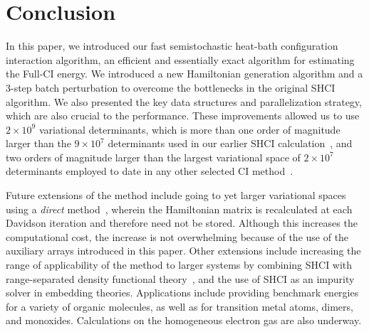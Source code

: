 \documentclass[%
reprint,
 superscriptaddress,
 amsmath,amssymb,
 aps,
]{revtex4-1}
\begin{document}
\section{Conclusion}
\label{conclusion}
In this paper, we introduced our fast semistochastic heat-bath configuration interaction algorithm, an efficient and essentially exact algorithm for estimating the Full-CI energy.
We introduced a new Hamiltonian generation algorithm and a 3-step batch perturbation to overcome the bottlenecks in the original SHCI algorithm.
We also presented the key data structures and parallelization strategy, which are also crucial to the performance.
These improvements allowed us to use $2 \times 10^9$ variational determinants, which is more than one order of magnitude larger than the $9\times 10^7$ determinants
used in our earlier SHCI calculation~\cite{ChiHolOttUmrShaZim-JPCA-18}, and two orders of magnitude larger than the largest variational space of $2\times 10^7$ determinants
employed to date in any other selected CI method~\cite{GarSceLooCaf-JCP-17}.

Future extensions of the method include going to yet larger variational spaces using a \emph{direct} method~\cite{Knowles1984,IvaRue-TCA-01}, wherein the Hamiltonian matrix is recalculated at each Davidson iteration and therefore need not be stored.
Although this increases the computational cost, the increase is not overwhelming because of the use of the auxiliary arrays introduced in this paper.
Other extensions include increasing the range of applicability of the method to larger systems by combining SHCI with range-separated density functional theory~\cite{Sav-INC-96},
and the use of SHCI as an impurity solver in embedding theories.
Applications include providing benchmark energies for a variety of organic molecules, as well as for transition metal atoms, dimers, and monoxides.
Calculations on the homogeneous electron gas are also underway.\\[1mm]
\end{document}
